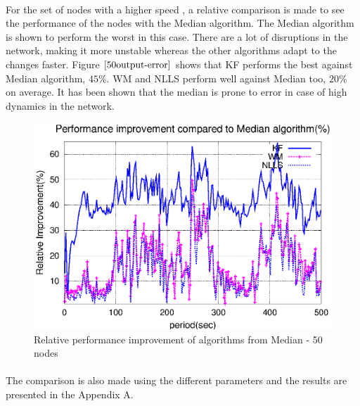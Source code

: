 \documentclass[a4paper,10pt]{report}
\begin{document}
\paragraph*{}
For the set of nodes with a higher speed , a relative comparison is made to see the performance of the nodes with the Median algorithm. The Median algorithm is shown to perform the worst in this case. There are a lot of disruptions in the network, making it more unstable whereas the other algorithms adapt to the changes faster. Figure $\ref{50output-error}$ shows that KF performs the best against Median algorithm, $45\%$. WM and NLLS perform well against Median too, $20\%$ on average. It has been shown that the median is prone to error in case of high dynamics in the network.
\begin{figure}[!h]
\centering
\includegraphics[width=0.7  \textwidth]{50output-error}
\caption{Relative performance improvement of algorithms from Median - 50 nodes} \label{50output-error}
\end{figure}
\paragraph*{}
The comparison is also made using the different parameters and the results are presented in the Appendix A.
\end{document}
